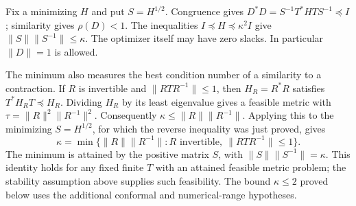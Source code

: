 Fix a minimizing $H$ and put $S=H^{1/2}$. Congruence gives
$D^*D=S^{-1}T^*HTS^{-1}\preceq I$; similarity gives $\rho(D)<1$.
The inequalities $I\preceq H\preceq\kappa^2I$ give
$\|S\|\|S^{-1}\|\le\kappa$. The optimizer itself may have zero
slacks. In particular $\|D\|=1$ is allowed.

The minimum also measures the best condition number of a similarity to
a contraction. If $R$ is invertible and $\|RTR^{-1}\|\le1$, then
$H_R=R^*R$ satisfies $T^*H_RT\preceq H_R$. Dividing $H_R$ by its
least eigenvalue gives a feasible metric with
$\tau=\|R\|^2\|R^{-1}\|^2$. Consequently
$\kappa\le\|R\|\|R^{-1}\|$. Applying this to the minimizing
$S=H^{1/2}$, for which the reverse inequality was just proved, gives
\begin{equation}\label{eq:optimal-similarity}
 \kappa=\min\{\|R\|\|R^{-1}\|:
 R\text{ invertible},\ \|RTR^{-1}\|\le1\}.
\end{equation}
The minimum is attained by the positive matrix $S$, with
$\|S\|\|S^{-1}\|=\kappa$. This identity holds for any fixed finite
$T$ with an attained feasible metric problem; the stability assumption
above supplies such feasibility. The bound $\kappa\le2$ proved below
uses the additional conformal and numerical-range hypotheses.

